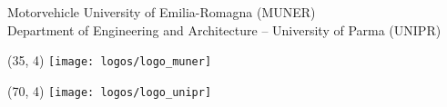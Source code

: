 \begin{frame}[plain]
	\vspace{5.5mm}

	\maketitle
	
	\begin{center}
		\vspace{-0.75cm}
		{\scriptsize
			Motorvehicle University of Emilia-Romagna (MUNER)\\
			Department of Engineering and Architecture -- University of Parma (UNIPR)\\
		}
	\end{center}

	\begin{textblock}{25}(35, 4)
		\texttt{[image: logos/logo\_muner]}
	\end{textblock}

	\begin{textblock}{30}(70, 4)
		\texttt{[image: logos/logo\_unipr]}
	\end{textblock}

\end{frame}